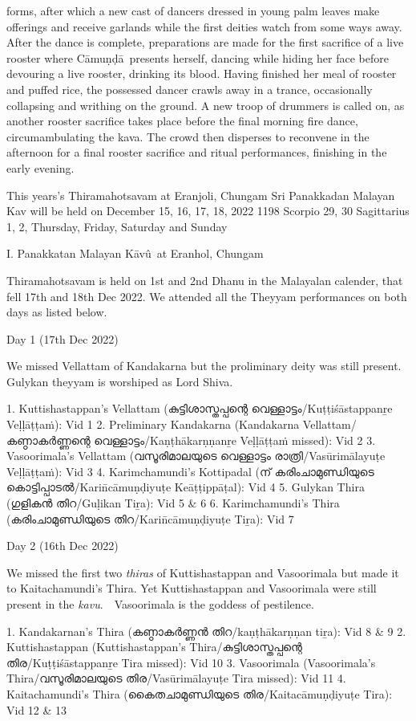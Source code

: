 \documentclass[a4paper, 11pt]{article} %
\newcommand{\camunda}[0]{C\={a}mu\d{n}\d{d}\={a}}
\newcommand{\Kavu}[0]{K\={a}v\^{u}}
\begin{document}
forms, after which a new cast of dancers dressed in young palm leaves make offerings and receive garlands while the first deities watch from some ways away.
After the dance is complete, preparations are made for the first sacrifice of a live rooster where \camunda\ presents herself, dancing while hiding her face before devouring a live rooster, drinking its blood.
Having finished her meal of rooster and puffed rice, the possessed dancer crawls away in a trance, occasionally collapsing and writhing on the ground. 
A new troop of drummers is called on, as another rooster sacrifice takes place before the final morning fire dance, circumambulating the kava.
The crowd then disperses to reconvene in the afternoon for a final rooster sacrifice and ritual performances, finishing in the early evening.

This years's Thiramahotsavam at Eranjoli, Chungam Sri Panakkadan Malayan Kav will be held on December 15, 16, 17, 18, 2022 1198 Scorpio 29, 30 Sagittarius 1, 2, Thursday, Friday, Saturday and Sunday

I. Panakkatan Malayan \Kavu\ at Eranhol, Chungam

Thiramahotsavam is held on 1st and 2nd Dhanu in the Malayalan calender, that fell 17th and 18th Dec 2022. We attended all the Theyyam performances on both days as listed below.

Day 1 (17th Dec 2022)

We missed Vellattam of Kandakarna but the proliminary deity was still present. Gulykan theyyam is worshiped as Lord Shiva.

1. Kuttishastappan's Vellattam (കുട്ടിശാസ്തപ്പന്റെ വെള്ളാട്ടം/Kuṭṭiśāstappanṟe Veḷḷāṭṭaṁ): Vid 1
2. Preliminary Kandakarna (Kandakarna Vellattam/കണ്ഠാകർണ്ണന്റെ വെള്ളാട്ടം/Kaṇṭhākarṇṇanṟe Veḷḷāṭṭaṁ missed): Vid 2
3. Vasoorimala's Vellattam (വസൂരിമാലയുടെ വെള്ളാട്ടം രാത്രി/Vasūrimālayuṭe Veḷḷāṭṭaṁ): Vid 3
4. Karimchamundi's Kottipadal (ന് കരിംചാമുണ്ഡിയുടെ കൊട്ടിപ്പാടൽ/Karin̄cāmuṇḍiyuṭe Keāṭṭippāṭal): Vid 4
5. Gulykan Thira (ഗുളികൻ തിറ/Guḷikan Tiṟa): Vid 5 & 6
6. Karimchamundi's Thira (കരിംചാമുണ്ഡിയുടെ തിറ/Karin̄cāmuṇḍiyuṭe Tiṟa): Vid 7

Day 2 (16th Dec 2022)

We missed the first two \textit{thiras} of Kuttishastappan and Vasoorimala but made it to Kaitachamundi's Thira. Yet Kuttishastappan and Vasoorimala were still present in the \textit{kavu}.　Vasoorimala is the goddess of pestilence.

1. Kandakarnan's Thira (കണ്ഠാകർണ്ണൻ തിറ/kaṇṭhākarṇṇan tiṟa): Vid 8 & 9
2. Kuttishastappan (Kuttishastappan's Thira/കുട്ടിശാസ്തപ്പന്റെ തിര/Kuṭṭiśāstappanṟe Tira missed): Vid 10
3. Vasoorimala (Vasoorimala's Thira/വസൂരിമാലയുടെ തിര/Vasūrimālayuṭe Tira missed): Vid 11
4. Kaitachamundi's Thira (കൈതചാമുണ്ഡിയുടെ തിര/Kaitacāmuṇḍiyuṭe Tira): Vid 12 & 13
\end{document}
